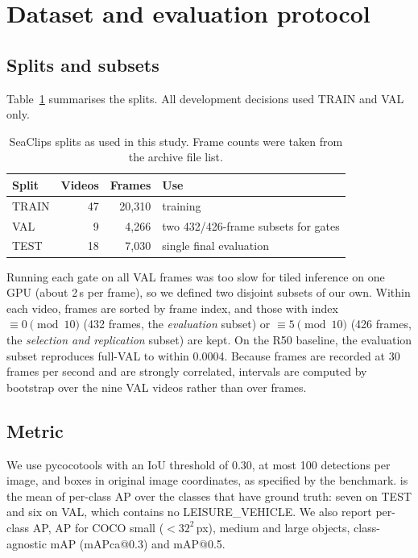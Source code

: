 \section{Dataset and evaluation protocol}\label{sec:protocol}

\subsection{Splits and subsets}
Table~\ref{tab:splits} summarises the splits. All development decisions used TRAIN and VAL only.

\begin{table}[t]
\centering
\caption{SeaClips splits as used in this study. Frame counts were taken from the archive file list.}
\label{tab:splits}
\begin{tabular}{lrrl}
\toprule
Split & Videos & Frames & Use \\
\midrule
TRAIN & 47 & 20{,}310 & training \\
VAL & 9 & 4{,}266 & two 432/426-frame subsets for gates \\
TEST & 18 & 7{,}030 & single final evaluation \\
\bottomrule
\end{tabular}
\end{table}

Running each gate on all VAL frames was too slow for tiled inference on one GPU (about 2\,s per frame), so we defined two disjoint subsets of our own. Within each video, frames are sorted by frame index, and those with index $\equiv 0 \pmod{10}$ (432 frames, the \emph{evaluation} subset) or $\equiv 5 \pmod{10}$ (426 frames, the \emph{selection and replication} subset) are kept. On the R50 baseline, the evaluation subset reproduces full-VAL \mapthree{} to within 0.0004. Because frames are recorded at 30\,frames per second and are strongly correlated, intervals are computed by bootstrap over the nine VAL videos rather than over frames.

\subsection{Metric}
We use pycocotools \citep{lin2014coco} with an IoU threshold of 0.30, at most 100 detections per image, and boxes in original image coordinates, as specified by the benchmark. \mapthree{} is the mean of per-class AP over the classes that have ground truth: seven on TEST and six on VAL, which contains no LEISURE\_VEHICLE. We also report per-class AP, AP for COCO small ($<32^2$\,px), medium and large objects, class-agnostic mAP (mAPca@0.3) and mAP@0.5.

